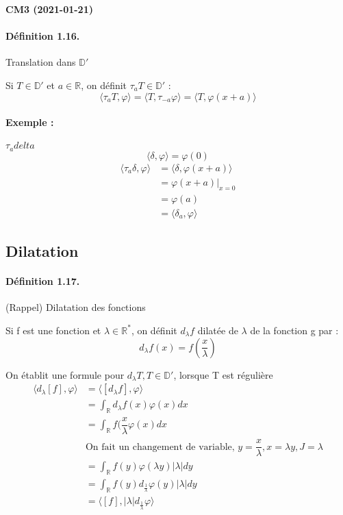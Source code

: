 \documentclass[12pt,a4paper]{report}
\newcommand{\ens}[1]{\mathbb{#1}}
\begin{document}
\begin{center}
\textbf{CM3 (2021-01-21)}
\end{center}

\paragraph{Définition 1.16.} Translation dans \(\ens{D}'\)

Si \(T \in \ens{D}'\) et \(a \in \ens{R}\), on définit \(\tau_a T \in \ens{D}'\) :
\[
	\langle \tau_a T, \varphi \rangle = \langle T, \tau_{-a} \varphi \rangle = \langle T, \varphi(x+a) \rangle
\]

\paragraph{Exemple :} \(\tau_a delta\)
\[
	\langle \delta, \varphi \rangle = \varphi(0)
\]
\begin{align*}
	\langle \tau_a \delta, \varphi \rangle &= \langle \delta, \varphi(x+a) \rangle\\
	&= \varphi (x+a)\vert_{x = 0}\\
	&= \varphi(a)\\
	&= \langle \delta_a, \varphi \rangle
\end{align*}

\subsection{Dilatation}

\paragraph{Définition 1.17.} (Rappel) Dilatation des fonctions

Si f est une fonction et \(\lambda \in \ens{R^*}\), on définit \(d_\lambda f\) dilatée de \(\lambda\) de la fonction g par :
\[
	d_\lambda f (x) = f(\dfrac{x}{\lambda}) 
\]

On établit une formule pour \(d_\lambda T, T \in \ens{D'}\), lorsque T est régulière
\begin{align*}
	\langle d_\lambda [f], \varphi \rangle &= \langle \left[d_\lambda f\right], \varphi \rangle\\
	&= \int_{\ens{R}} d_\lambda f(x) \varphi(x) dx\\
	&= \int_{\ens{R}} f(\dfrac{x}{\lambda} \varphi(x) dx\\
	& \text{On fait un changement de variable, } y= \dfrac{x}{\lambda}, x = \lambda y, J = \lambda\\
	&= \int_{\ens{R}} f(y) \varphi (\lambda y) \vert \lambda \vert dy\\
	&= \int_{\ens{R}} f(y) d_{\frac{1}{\lambda}}\varphi (y) \vert \lambda \vert dy\\
	&= \langle [f], \vert \lambda \vert d_{\frac{1}{\lambda}} \varphi \rangle
\end{align*}
\end{document}
